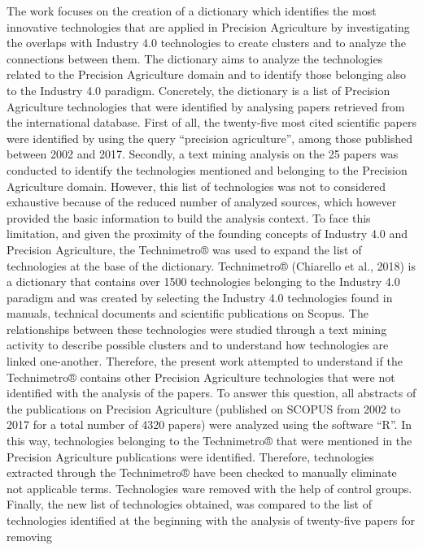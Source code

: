 \documentclass[]{book}
\begin{document}
The work focuses on the creation of a dictionary which identifies the
most innovative technologies that are applied in Precision Agriculture
by investigating the overlaps with Industry 4.0 technologies to create
clusters and to analyze the connections between them. The dictionary
aims to analyze the technologies related to the Precision Agriculture
domain and to identify those belonging also to the Industry 4.0
paradigm. Concretely, the dictionary is a list of Precision Agriculture
technologies that were identified by analysing papers retrieved from the
international database. First of all, the twenty-five most cited
scientific papers were identified by using the query ``precision
agriculture'', among those published between 2002 and 2017. Secondly, a
text mining analysis on the 25 papers was conducted to identify the
technologies mentioned and belonging to the Precision Agriculture
domain. However, this list of technologies was not to considered
exhaustive because of the reduced number of analyzed sources, which
however provided the basic information to build the analysis context. To
face this limitation, and given the proximity of the founding concepts
of Industry 4.0 and Precision Agriculture, the Technimetro® was used to
expand the list of technologies at the base of the dictionary.
Technimetro® (Chiarello et al., 2018) is a dictionary that contains over
1500 technologies belonging to the Industry 4.0 paradigm and was created
by selecting the Industry 4.0 technologies found in manuals, technical
documents and scientific publications on Scopus. The relationships
between these technologies were studied through a text mining activity
to describe possible clusters and to understand how technologies are
linked one-another. Therefore, the present work attempted to understand
if the Technimetro® contains other Precision Agriculture technologies
that were not identified with the analysis of the papers. To answer this
question, all abstracts of the publications on Precision Agriculture
(published on SCOPUS from 2002 to 2017 for a total number of 4320
papers) were analyzed using the software ``R''. In this way,
technologies belonging to the Technimetro® that were mentioned in the
Precision Agriculture publications were identified. Therefore,
technologies extracted through the Technimetro® have been checked to
manually eliminate not applicable terms. Technologies ware removed with
the help of control groups. Finally, the new list of technologies
obtained, was compared to the list of technologies identified at the
beginning with the analysis of twenty-five papers for removing
\end{document}
